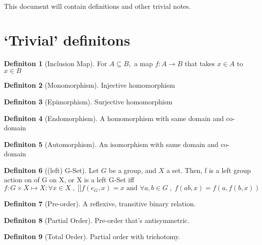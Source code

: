 \documentclass{article}
\theoremstyle{definition}
\theoremstyle{definition}
\newtheorem{definition}{Definiton}[section]
\begin{document}
This document will contain definitions and other trivial notes.
\section{`Trivial' definitons}

\begin{definition}[Inclusion Map] %
	For $ A \subseteq B, $ a map $ f:A \rightarrow B $ that takes $ x\in A $ to $ x \in B $
\end{definition}

\begin{definition}[Monomorphism] %
Injective homomorphism
\end{definition}

\begin{definition}[Epimorphism] %
Surjective homomorphism
\end{definition}

\begin{definition}[Endomorphism] %
A homomorphism with same domain and co-domain
\end{definition}

\begin{definition}[Automorphism] %
An isomorphism with same domain and co-domain
\end{definition}

\begin{definition}[(left) G-Set] %
Let $ G $ be a group, and $ X $ a set. Then, f is a left group action on of G on X, or X is a left G-Set iff
\[ f:G \times X \mapsto X : \forall x \in X \; , \;  [ [ f(e_G,x)=x \text{ and } \forall a,b \in G \; , \; f(ab,x)=f(a, f(b,x))  \]
\end{definition}

\begin{definition}[Pre-order] %
	A reflexive, transitive binary relation.
\end{definition}

\begin{definition}[Partial Order] %
Pre-order that's antisymmetric.
\end{definition}

\begin{definition}[Total Order] %
Partial order with trichotomy.
\end{definition}
\end{document}
